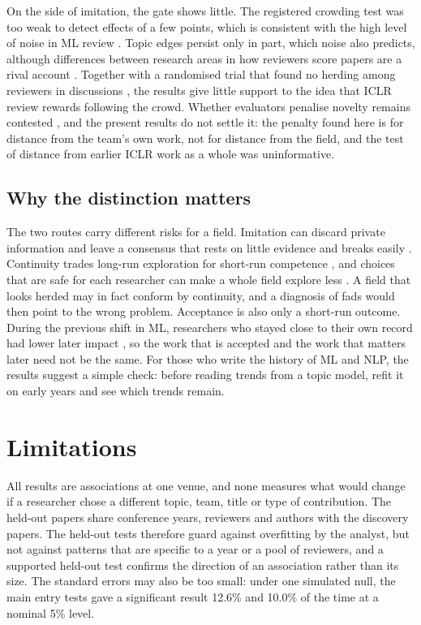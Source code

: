 On the side of imitation, the gate shows little. The registered crowding test was too weak to detect effects of a few
points, which is consistent with the high level of noise in ML review \citep{cortes2021inconsistency,
beygelzimer2023has}. Topic edges persist only in part, which noise also predicts, although differences between research
areas in how reviewers score papers are a rival account \citep{xu2026reviewer}. Together with a randomised trial that
found no herding among reviewers in discussions \citep{stelmakh2023large}, the results give little support to the idea
that ICLR review rewards following the crowd. Whether evaluators penalise novelty remains contested
\citep{boudreau2016looking,teplitskiy2022is}, and the present results do not settle it: the penalty found here is for
distance from the team's own work, not for distance from the field, and the test of distance from earlier ICLR work as
a whole was uninformative.

\subsection{Why the distinction matters}

The two routes carry different risks for a field. Imitation can discard private information and leave a consensus
that rests on little evidence and breaks easily \citep{bikhchandani1992theory,banerjee1992simple}. Continuity trades
long-run exploration for short-run competence \citep{march1991exploration}, and choices that are safe for each
researcher can make a whole field explore less \citep{rzhetsky2015choosing}. A field that looks herded may in fact
conform by continuity, and a diagnosis of fads would then point to the wrong problem. Acceptance is also only a
short-run outcome. During the previous shift in ML, researchers who stayed close to their own record had lower later
impact \citep{bao2025persistence}, so the work that is accepted and the work that matters later need not be the same. For those who write the history of ML and NLP, the results suggest a simple check: before reading trends from a
topic model, refit it on early years and see which trends remain.

\section{Limitations}
\label{sec:limitations}

All results are associations at one venue, and none measures what would change if a researcher chose a different
topic, team, title or type of contribution. The held-out papers share conference years, reviewers and authors with the
discovery papers. The held-out tests therefore guard against overfitting by the analyst, but not against patterns that
are specific to a year or a pool of reviewers, and a supported held-out test confirms the direction of an association
rather than its size. The standard errors may also be too small: under one simulated null, the main entry tests gave a
significant result 12.6\% and 10.0\% of the time at a nominal 5\% level.

